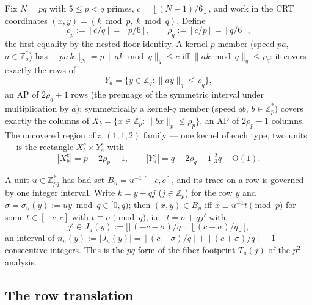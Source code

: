 \documentclass[11pt,a4paper]{article}
\numberwithin{equation}{section}
\theoremstyle{plain}
\theoremstyle{plain}
\theoremstyle{definition}
\theoremstyle{remark}
\newcommand{\Z}{\mathbb{Z}}
\newcommand{\floor}[1]{\left\lfloor #1 \right\rfloor}
\begin{document}
Fix $N=pq$ with $5\le p<q$ primes, $c=\floor{(N-1)/6}$, and work in the CRT
coordinates $(x,y)=(k\bmod p,\ k\bmod q)$. Define
\[
\rho_p:=\floor{c/q}=\floor{p/6},\qquad \rho_q:=\floor{c/p}=\floor{q/6},
\]
the first equality by the nested-floor identity. A kernel-$p$ member (speed
$pa$, $a\in\Z_q^{*}$) has $\|pa\,k\|_{N}=p\,\|ak\bmod q\|_q\le c$ iff
$\|ak\bmod q\|_q\le\rho_q$: it covers exactly the rows of
\[
Y_a=\{y\in\Z_q:\|ay\|_q\le\rho_q\},
\]
an AP of $2\rho_q+1$ rows (the preimage of the symmetric interval under
multiplication by $a$); symmetrically a kernel-$q$ member (speed $qb$,
$b\in\Z_p^{*}$) covers exactly the columns of
$X_b=\{x\in\Z_p:\|bx\|_p\le\rho_p\}$, an AP of $2\rho_p+1$ columns. The
uncovered region of a $(1,1,2)$ family --- one kernel of each type, two units
--- is the rectangle $X_b^{c}\times Y_a^{c}$ with
\[
|X_b^{c}|=p-2\rho_p-1,\qquad |Y_a^{c}|=q-2\rho_q-1\ \tfrac{2}{3}q-\mathrm{O}(1).
\]

A unit $u\in\Z_{pq}^{*}$ has bad set $B_u=u^{-1}[-c,c]$, and its trace on a
row is governed by one integer interval. Write $k=y+qj$ ($j\in\Z_p$) for the
row $y$ and $\sigma=\sigma_u(y):=uy\bmod q\in[0,q)$; then
$(x,y)\in B_u$ iff $x\equiv u^{-1}t\pmod p$ for some $t\in[-c,c]$ with
$t\equiv\sigma\pmod q$, i.e.\ $t=\sigma+qj'$ with
\begin{equation}\label{eq:Jinterval}
j'\in J_u(y):=\bigl[\lceil(-c-\sigma)/q\rceil,\ \floor{(c-\sigma)/q}\bigr],
\end{equation}
an interval of $n_u(y):=|J_u(y)|=\floor{(c-\sigma)/q}+\floor{(c+\sigma)/q}+1$
consecutive integers. This is the $pq$ form of the fiber footprint
$T_u(j)$ of the $p^2$ analysis.

\subsection{The row translation}\label{sec:pq-thm}
\end{document}
